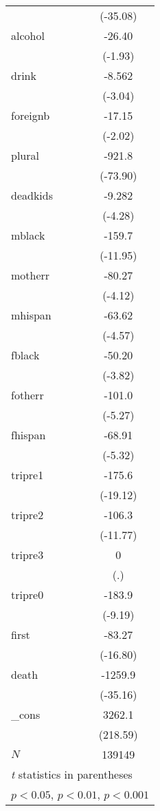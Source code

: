 {\begin{longtable}{l*{1}{c}}
            &    (-35.08)         \\
[1em]
alcohol     &      -26.40         \\
            &     (-1.93)         \\
[1em]
drink       &      -8.562\sym{**} \\
            &     (-3.04)         \\
[1em]
foreignb    &      -17.15\sym{*}  \\
            &     (-2.02)         \\
[1em]
plural      &      -921.8\sym{***}\\
            &    (-73.90)         \\
[1em]
deadkids    &      -9.282\sym{***}\\
            &     (-4.28)         \\
[1em]
mblack      &      -159.7\sym{***}\\
            &    (-11.95)         \\
[1em]
motherr     &      -80.27\sym{***}\\
            &     (-4.12)         \\
[1em]
mhispan     &      -63.62\sym{***}\\
            &     (-4.57)         \\
[1em]
fblack      &      -50.20\sym{***}\\
            &     (-3.82)         \\
[1em]
fotherr     &      -101.0\sym{***}\\
            &     (-5.27)         \\
[1em]
fhispan     &      -68.91\sym{***}\\
            &     (-5.32)         \\
[1em]
tripre1     &      -175.6\sym{***}\\
            &    (-19.12)         \\
[1em]
tripre2     &      -106.3\sym{***}\\
            &    (-11.77)         \\
[1em]
tripre3     &           0         \\
            &         (.)         \\
[1em]
tripre0     &      -183.9\sym{***}\\
            &     (-9.19)         \\
[1em]
first       &      -83.27\sym{***}\\
            &    (-16.80)         \\
[1em]
death       &     -1259.9\sym{***}\\
            &    (-35.16)         \\
[1em]
\_cons      &      3262.1\sym{***}\\
            &    (218.59)         \\
\hline
\(N\)       &      139149         \\
\hline\hline
\multicolumn{2}{l}{\footnotesize \textit{t} statistics in parentheses}\\
\multicolumn{2}{l}{\footnotesize \sym{*} \(p<0.05\), \sym{**} \(p<0.01\), \sym{***} \(p<0.001\)}\\
\end{longtable}
}
